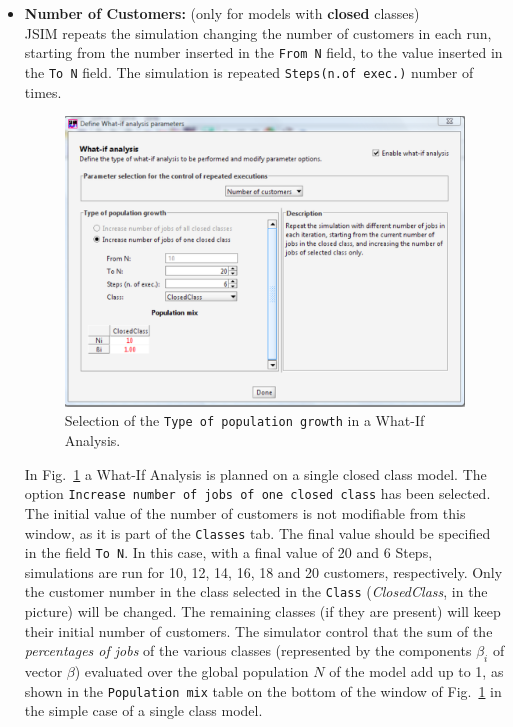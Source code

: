 \begin{itemize}
\item \textbf{Number of Customers:} (only for models with
\textbf{closed} classes)\\
JSIM repeats the simulation changing
the number of customers in each run, starting from the number
inserted in the \texttt{From N} field, to the value inserted in
the \texttt{To N} field. The simulation is repeated
\texttt{Steps(n.of exec.)} number of times.
\begin{figure}[hbt]
    \begin{center}
        \includegraphics[scale=.5]{img/jsimg/7.3.eps}
    \end{center}
    \caption{Selection of the \texttt{Type of population growth} in
    a What-If Analysis.}
    \label{fig:seltypepopg}
\end{figure}
In Fig.~\ref{fig:seltypepopg} a What-If Analysis is planned on a
single closed class model. The option \texttt{Increase number of
jobs of one closed class} has been selected. The initial value of
the number of customers is not modifiable from this window, as it
is part of the \texttt{Classes} tab. The final value should be
specified in the field \texttt{To N}. In this case, with a final
value of 20 and 6 Steps, simulations are run for 10, 12, 14, 16,
18 and 20 customers, respectively. Only the customer number in the
class selected in the \texttt{Class} (\emph{ClosedClass}, in the
picture) will be changed. The remaining classes (if they are
present) will keep their initial number of customers. The
simulator control that the sum of the \emph{percentages of jobs}
of the various classes (represented by the components $\beta_i$ of
vector \textbf{$\beta$}) evaluated over the global population $N$
of the model add up to 1, as shown in the \texttt{Population mix}
table on the bottom of the window of Fig.~\ref{fig:seltypepopg} in
the simple case of a single class model.


\end{itemize}
